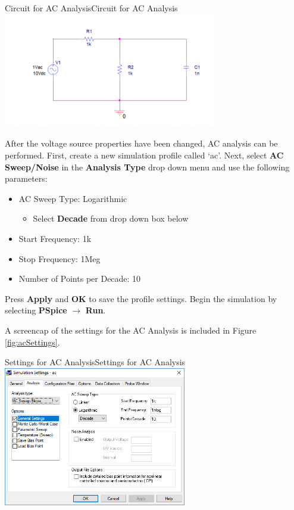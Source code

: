 \documentclass[12pt]{../manual}
\begin{document}
\begin{myfigure}[colback=white,label=fig:acCircuit]{Circuit for AC Analysis}{Circuit for AC Analysis}
\centering
\includegraphics[width=0.7\textwidth]{figures/ACAnalysisCircuitCrop.PNG}
\end{myfigure}

After the voltage source properties have been changed, AC analysis can be performed. First, create a new simulation profile called `ac'. Next, select \textbf{AC Sweep/Noise} in the \textbf{Analysis Type} drop down menu and use the following parameters:
\begin{itemize}
\item AC Sweep Type: Logarithmic 
\begin{itemize}
\item Select \textbf{Decade} from drop down box below
\end{itemize}
\item Start Frequency: 1k
\item Stop Frequency: 1Meg
\item Number of Points per Decade: 10
\end{itemize}
Press \textbf{Apply} and \textbf{OK} to save the profile settings. Begin the simulation by selecting \textbf{PSpice} $\to$ \textbf{Run}.

A screencap of the settings for the AC Analysis is included in Figure \ref{fig:acSettings}.

\begin{myfigure}[label=fig:acSettings]{Settings for AC Analysis}{Settings for AC Analysis}
\centering
\includegraphics[width=0.6\textwidth]{figures/ACAnalysisSettings.PNG}
\end{myfigure}
\end{document}
